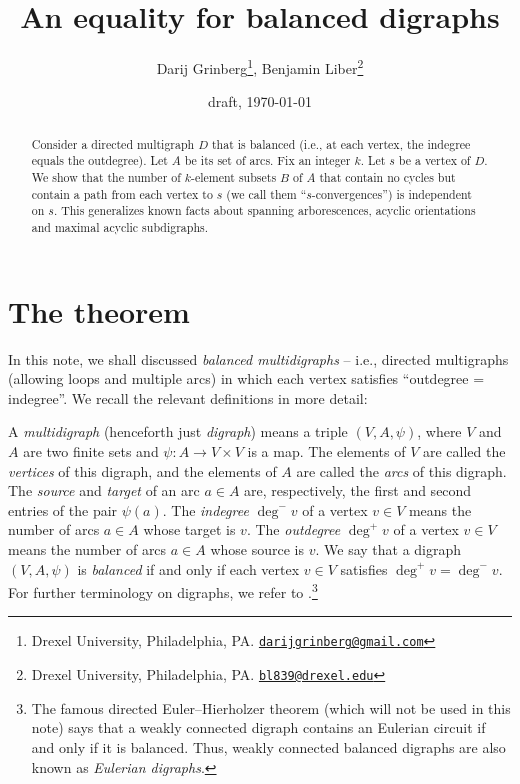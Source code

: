 \documentclass[numbers=enddot,12pt,final,onecolumn,notitlepage]{scrartcl}%
\theoremstyle{definition}
\theoremstyle{plainsl}
\begin{document}
\title{An equality for balanced digraphs}
\author{Darij Grinberg\thanks{Drexel University, Philadelphia, PA.
\href{mailto:darijgrinberg@gmail.com}{\texttt{darijgrinberg@gmail.com}}},
Benjamin Liber\thanks{Drexel University, Philadelphia, PA.
\href{mailto:bl839@drexel.edu}{\texttt{bl839@drexel.edu}}}}
\date{draft, \today}
\maketitle

\begin{abstract}
Consider a directed multigraph $D$ that is balanced (i.e., at each vertex, the
indegree equals the outdegree). Let $A$ be its set of arcs. Fix an integer
$k$. Let $s$ be a vertex of $D$. We show that the number of $k$-element
subsets $B$ of $A$ that contain no cycles but contain a path from each vertex
to $s$ (we call them \textquotedblleft$s$-convergences\textquotedblright) is
independent on $s$. This generalizes known facts about spanning arborescences,
acyclic orientations and maximal acyclic subdigraphs.

\end{abstract}

\section{The theorem}

In this note, we shall discussed \emph{balanced multidigraphs} -- i.e.,
directed multigraphs (allowing loops and multiple arcs) in which each vertex
satisfies \textquotedblleft outdegree = indegree\textquotedblright. We recall
the relevant definitions in more detail:

A \emph{multidigraph} (henceforth just \emph{digraph}) means a triple
$(V,A,\psi)$, where $V$ and $A$ are two finite sets and $\psi: A \to V \times
V$ is a map. The elements of $V$ are called the \emph{vertices} of this
digraph, and the elements of $A$ are called the \emph{arcs} of this digraph.
The \emph{source} and \emph{target} of an arc $a \in A$ are, respectively, the
first and second entries of the pair $\psi(a)$. The \emph{indegree} $\deg
^{-}v$ of a vertex $v \in V$ means the number of arcs $a \in A$ whose target
is $v$. The \emph{outdegree} $\deg^{+}v$ of a vertex $v \in V$ means the
number of arcs $a \in A$ whose source is $v$. We say that a digraph
$(V,A,\psi)$ is \emph{balanced} if and only if each vertex $v \in V$ satisfies
$\deg^{+}v = \deg^{-}v$. For further terminology on digraphs, we refer to
\cite{22s}.\footnote{The famous directed Euler--Hierholzer theorem (which will
not be used in this note) says that a weakly connected digraph contains an
Eulerian circuit if and only if it is balanced. Thus, weakly connected
balanced digraphs are also known as \emph{Eulerian digraphs}.}
\end{document}
